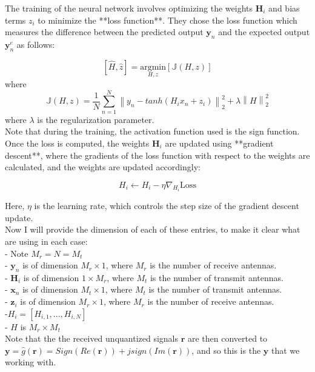 \documentclass{article}
\begin{document}
The training of the neural network involves optimizing the weights \( \mathbf{H}_i \) and bias terms \( z_i \) to minimize the **loss function**. They chose the loss function which measures the difference between the predicted output \( \mathbf{y}_n \) and the expected output \( \mathbf{y}_n^e \) as follows: 

\[
[\hat{H},\hat{z}] = \underset{H,z}{\text{argmin}} [\mathbb{J}(H,z)]
\] where 
\[
\mathbb{J}(H,z) = \frac{1}{N} \sum_{n=1}^{N} \left\| y_n - tanh(H_i x_n + z_i) \right\|_2^2 + \lambda \left\| H \right\|_2^2
\]where \( \lambda \) is the regularization parameter.\\ Note that during the training, the activation function used is the sign function. \\ 

Once the loss is computed, the weights \( \mathbf{H}_i \) are updated using **gradient descent**, where the gradients of the loss function with respect to the weights are calculated, and the weights are updated accordingly:

\[
H_i \leftarrow H_i - \eta \nabla_{H_i} \text{Loss}
\]

Here, \( \eta \) is the learning rate, which controls the step size of the gradient descent update. \\ 

Now I will provide the dimension of each of these entries, to make it clear what are using in each case: \\
- Note $M_r = N = M_t$ \\
- \( \mathbf{y}_n \) is of dimension \( M_r \times 1 \), where \( M_r \) is the number of receive antennas. \\
- \( \mathbf{H}_i \) is of dimension \( 1 \times M_r \), where \( M_t \) is the number of transmit antennas.\\
- \( \mathbf{x}_n \) is of dimension \( M_t \times 1 \), where \( M_t \) is the number of transmit antennas. \\
- \( \mathbf{z}_i \) is of dimension \( M_r \times 1 \), where \( M_r \) is the number of receive antennas. \\
-\(H_i=[H_{i,1}, ... , H_{i,N}]\)\\ 
- \( H \) is $M_r \times M_t$\\ 
Note that the the received unquantized signals $\boldsymbol{r}$ are then converted to $\boldsymbol{y} = \hat{g}(\boldsymbol{r}) = Sign(Re(\boldsymbol{r}))+jsign(Im(\boldsymbol{r}))$, and so this is the $\boldsymbol{y}$ that we working with. 
\end{document}
